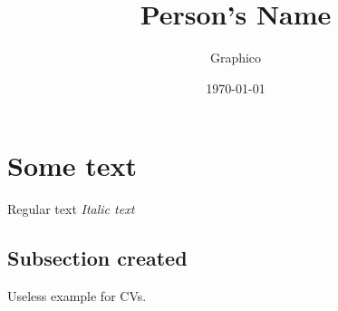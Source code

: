 \documentclass{article}%
\title{Person's Name}%
\author{Graphico}%
\date{\today}%
\begin{document}
%
\pagestyle{empty}%
\normalsize%
\maketitle%
\section{Some text}%
\label{sec:Sometext}%
Regular text\newline%
%
\textit{Italic text\newline%
}%
\subsection{Subsection created}%
\label{subsec:Subsectioncreated}%
Useless example  %
for CVs.\newline%

%
\end{document}

